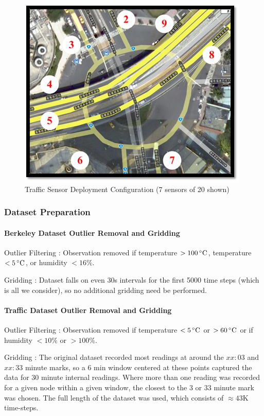 \begin{figure}[H]
\centering
\includegraphics[scale=0.5]{traffic_wsn.png}
\caption{Traffic Sensor Deployment Configuration (7 sensors of 20 shown)}
\end{figure}

\subsubsection{Dataset Preparation}

\paragraph*{Berkeley Dataset Outlier Removal and Gridding}

Outlier Filtering : Observation removed if temperature \mbox{$>100\,^{\circ}\mathrm{C}$}, temperature \mbox{$<5\,^{\circ}\mathrm{C}$}, or humidity \mbox{$<16\%$}.

Gridding : Dataset falls on even 30s intervals for the first 5000 time steps (which is all we consider), so no additional gridding need be performed.

\paragraph*{Traffic Dataset Outlier Removal and Gridding}

Outlier Filtering : Observation removed if temperature \mbox{$<5\,^{\circ}\mathrm{C}$} or \mbox{$>60\,^{\circ}\mathrm{C}$} or if humidity \mbox{$<10\%$} or \mbox{$>100\%$}.

Gridding : The original dataset recorded most readings at around the $xx:03$ and $xx:33$ minute marks, so a $6$ min window centered at
these points captured the data for $30$ minute internal readings.
Where more than one reading was recorded for a given node within a given window, the closest to the $3$ or $33$ minute mark was chosen.
The full length of the dataset was used, which consists of $\approx 43$K time-steps.


